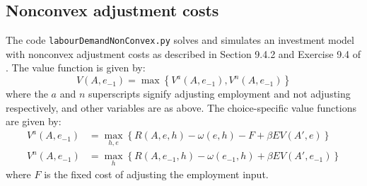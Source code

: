 \subsection{Nonconvex adjustment costs}

The code \texttt{labourDemandNonConvex.py} solves and simulates an investment model with nonconvex adjustment costs as described in Section 9.4.2 and Exercise 9.4 of \citet{adda2003dynamic}. The value function is given by:
%
\begin{equation}
	V(A, e_{-1}) = \max \left\{ V^a(A, e_{-1}), V^n(A, e_{-1}) \right\}
\end{equation}
%
where the \(a\) and \(n\) superscripts signify adjusting employment and not adjusting respectively, and other variables are as above. The choice-specific value functions are given by:
%
\begin{align}
	V^a(A, e_{-1}) &= \max_{h,e} \left\{ R(A,e,h) - \omega(e,h) - F + \beta EV(A', e) \right\} \\
	V^n(A, e_{-1}) &= \max_{h} \left\{ R(A,e_{-1},h) - \omega(e_{-1},h) + \beta EV(A', e_{-1}) \right\}
\end{align}
%
where \(F\) is the fixed cost of adjusting the employment input.